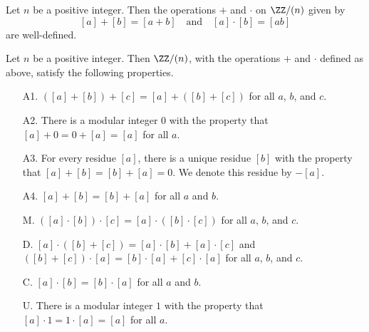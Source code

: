 \documentclass{article}
\begin{document}
\begin{cor}
Let $n$ be a positive integer. Then the operations $+$ and $\cdot$ on $\ZZ/(n)$ given by \[ [a] + [b] = [a+b] \quad \mathrm{and} \quad [a] \cdot [b] = [ab] \] are well-defined.
\end{cor}

\begin{thm}
Let $n$ be a positive integer. Then $\ZZ/(n)$, with the operations $+$ and $\cdot$ defined as above, satisfy the following properties.
\begin{itemize}
\item[A1.] $\left([a] + [b]\right) + [c] = [a] + \left([b] + [c]\right)$ for all $a$, $b$, and $c$.
\item[A2.] There is a modular integer $0$ with the property that $[a] + 0 = 0 + [a] = [a]$ for all $a$.
\item[A3.] For every residue $[a]$, there is a unique residue $[b]$ with the property that $[a] + [b] = [b] + [a] = 0$. We denote this residue by $-[a]$.
\item[A4.] $[a] + [b] = [b] + [a]$ for all $a$ and $b$.
\item[M.] $\left([a] \cdot [b]\right) \cdot [c] = [a] \cdot \left([b] \cdot [c]\right)$ for all $a$, $b$, and $c$.
\item[D.] $[a] \cdot \left([b] + [c]\right) = [a] \cdot [b] + [a] \cdot [c]$ and $\left([b] + [c]\right) \cdot [a] = [b] \cdot [a] + [c] \cdot [a]$ for all $a$, $b$, and $c$.
\item[C.] $[a] \cdot [b] = [b] \cdot [a]$ for all $a$ and $b$.
\item[U.] There is a modular integer $1$ with the property that $[a] \cdot 1 = 1 \cdot [a] = [a]$ for all $a$.
\end{itemize}
\end{thm}
\end{document}
